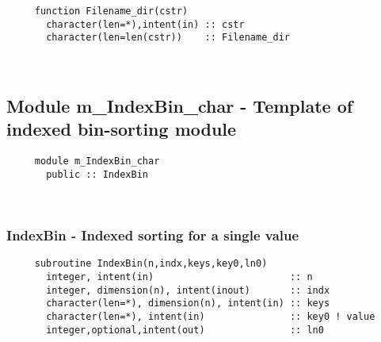 \begin{verbatim} 
     function Filename_dir(cstr)
       character(len=*),intent(in) :: cstr
       character(len=len(cstr))    :: Filename_dir
 \end{verbatim}
%


 
 
\mbox{}\hrulefill\ 
 
\subsection{Module m\_IndexBin\_char - Template of indexed bin-sorting module }

\begin{verbatim} 
     module m_IndexBin_char
       public :: IndexBin
 \end{verbatim}
%
 
 
\mbox{}\hrulefill\ 
 
\subsubsection{IndexBin - Indexed sorting for a single value}
 
\begin{verbatim} 
     subroutine IndexBin(n,indx,keys,key0,ln0)
       integer, intent(in)                        :: n
       integer, dimension(n), intent(inout)       :: indx
       character(len=*), dimension(n), intent(in) :: keys
       character(len=*), intent(in)               :: key0 ! value
       integer,optional,intent(out)               :: ln0
 \end{verbatim}
%
 
